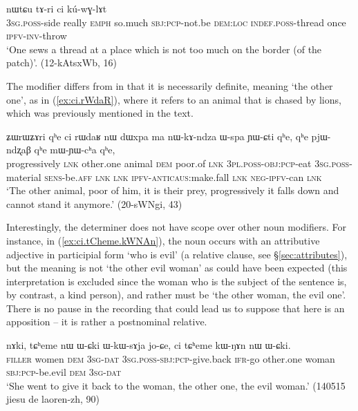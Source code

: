 \begin{exe}
\ex \label{ex:sthWci.kWmaR}
 nɯtɕu tɤ-ri ci kú-wɣ-lɤt \\
\textsc{3sg}.\textsc{poss}-side really \textsc{emph} so.much \textsc{sbj}:\textsc{pcp}-not.be \textsc{dem}:\textsc{loc} \textsc{indef}.\textsc{poss}-thread once \textsc{ipfv}-\textsc{inv}-throw \\
\glt `One sews a thread at a place which is not too much on the border (of the patch)'. (12-kAtsxWb, 16)
\end{exe}

The modifier  differs from  in that it is necessarily definite, meaning `the other one', as in (\ref{ex:ci.rWdaR}), where it refers to an animal that is chased by lions, which was previously mentioned in the text.

\begin{exe}
\ex \label{ex:ci.rWdaR}
\gll ʑɯrɯʑɤri qʰe ci rɯdaʁ nɯ dɯxpa ma nɯ-kɤ-ndza ɯ-spa ɲɯ-ɕti qʰe, qʰe pjɯ-ndʐaβ qʰe mɯ-ɲɯ-cʰa qʰe, \\
progressively \textsc{lnk} other.one animal \textsc{dem} poor.of \textsc{lnk} \textsc{3pl}.\textsc{poss}-\textsc{obj}:\textsc{pcp}-eat \textsc{3sg}.\textsc{poss}-material \textsc{sens}-be.\textsc{aff} \textsc{lnk} \textsc{lnk} \textsc{ipfv}-\textsc{anticaus}:make.fall \textsc{lnk} \textsc{neg}-\textsc{ipfv}-can \textsc{lnk} \\
\glt `The other animal, poor of him, it is their prey, progressively it falls down and cannot stand it anymore.' (20-sWNgi, 43)
\end{exe}

Interestingly, the determiner  does not have scope over other noun modifiers. For instance, in (\ref{ex:ci.tCheme.kWNAn}), the noun  occurs with an attributive adjective in participial form  `who is evil' (a relative clause, see §\ref{sec:attributes}), but the meaning is not `the other evil woman' as could have been expected (this interpretation is excluded since the woman who is the subject of the sentence is, by contrast, a kind person), and rather must be `the other woman, the evil one'. There is no pause in the recording that could lead us to suppose that  here is an apposition -- it is rather a postnominal relative.

\begin{exe}
\ex \label{ex:ci.tCheme.kWNAn}
\gll nɤki, tɕʰeme nɯ ɯ-ɕki ɯ-kɯ-sɤja jo-ɕe, ci tɕʰeme kɯ-ŋɤn nɯ ɯ-ɕki. \\
\textsc{filler} women \textsc{dem} \textsc{3sg}-\textsc{dat} \textsc{3sg}.\textsc{poss}-\textsc{sbj}:\textsc{pcp}-give.back \textsc{ifr}-go other.one woman \textsc{sbj}:\textsc{pcp}-be.evil \textsc{dem} \textsc{3sg}-\textsc{dat} \\
\glt `She went to give it back to the woman, the other one, the evil woman.' (140515 jiesu de laoren-zh, 90)
\end{exe}

